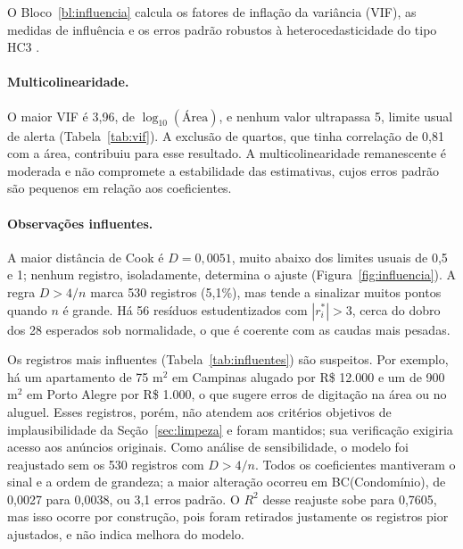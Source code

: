 \documentclass[12pt,a4paper]{article}
\newcommand{\Rtwo}{\ensuremath{R^2}}
\begin{document}
O Bloco~\ref{bl:influencia} calcula os fatores de inflação da variância (VIF), as medidas de influência e os erros padrão robustos à heterocedasticidade do tipo HC3 \cite{white,mackinnon}.



\begin{table}[H]
\centering
\caption{VIF e comparação entre os erros padrão clássicos e robustos (HC3).}
\label{tab:vif}
\footnotesize

\end{table}

\paragraph{Multicolinearidade.} O maior VIF é 3,96, de $\log_{10}(\text{Área})$, e nenhum valor ultrapassa 5, limite usual de alerta (Tabela~\ref{tab:vif}). A exclusão de quartos, que tinha correlação de 0,81 com a área, contribuiu para esse resultado. A multicolinearidade remanescente é moderada e não compromete a estabilidade das estimativas, cujos erros padrão são pequenos em relação aos coeficientes.

\paragraph{Observações influentes.} A maior distância de Cook é $D=0{,}0051$, muito abaixo dos limites usuais de 0,5 e 1; nenhum registro, isoladamente, determina o ajuste (Figura~\ref{fig:influencia}). A regra $D>4/n$ marca 530 registros (5,1\%), mas tende a sinalizar muitos pontos quando $n$ é grande. Há 56 resíduos estudentizados com $|r^*_i|>3$, cerca do dobro dos 28 esperados sob normalidade, o que é coerente com as caudas mais pesadas.

\begin{table}[H]
\centering
\caption{Cinco registros com maior distância de Cook ($D$), com alavancagem $h$ e resíduo estudentizado $r^*$.}
\label{tab:influentes}
\footnotesize
\setlength{\tabcolsep}{4pt}

\end{table}

Os registros mais influentes (Tabela~\ref{tab:influentes}) são suspeitos. Por exemplo, há um apartamento de 75 m$^2$ em Campinas alugado por R\$ 12.000 e um de 900 m$^2$ em Porto Alegre por R\$ 1.000, o que sugere erros de digitação na área ou no aluguel. Esses registros, porém, não atendem aos critérios objetivos de implausibilidade da Seção~\ref{sec:limpeza} e foram mantidos; sua verificação exigiria acesso aos anúncios originais. Como análise de sensibilidade, o modelo foi reajustado sem os 530 registros com $D>4/n$. Todos os coeficientes mantiveram o sinal e a ordem de grandeza; a maior alteração ocorreu em BC(Condomínio), de 0,0027 para 0,0038, ou 3,1 erros padrão. O \Rtwo{} desse reajuste sobe para 0,7605, mas isso ocorre por construção, pois foram retirados justamente os registros pior ajustados, e não indica melhora do modelo.
\end{document}
